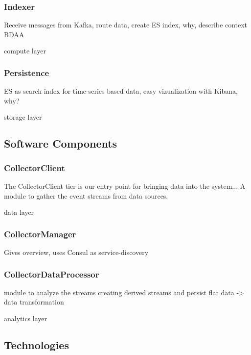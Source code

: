 \subsubsection{Indexer}

Receive messages from Kafka, route data, create ES index, why, describe context BDAA

compute layer

\subsubsection{Persistence}

ES as search index for time-series based data, easy vizualization with Kibana, why?

storage layer

\subsection{Software Components}

\subsubsection{CollectorClient}

The CollectorClient tier is our entry point for bringing data into the system...
A module to gather the event streams from data sources.

data layer

\subsubsection{CollectorManager}

Gives overview, uses Consul as service-discovery

\subsubsection{CollectorDataProcessor}

module to analyze the streams creating derived streams and persist flat data -> data transformation

analytics layer

\subsection{Technologies}



